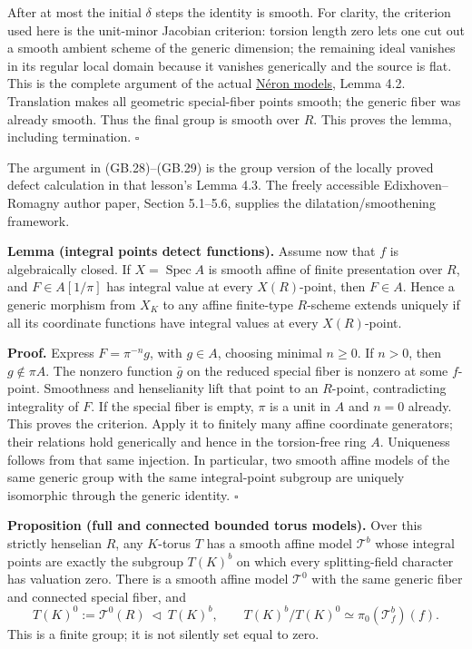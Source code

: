 \documentclass[
  11pt,
]{article}
\begin{document}
After at most the initial \(\delta\) steps the identity is smooth. For
clarity, the criterion used here is the unit-minor Jacobian criterion:
torsion length zero lets one cut out a smooth ambient scheme of the
generic dimension; the remaining ideal vanishes in its regular local
domain because it vanishes generically and the source is flat. This is
the complete argument of the actual \href{../AG-GS/AG-GS-07.html}{Néron
models}, Lemma 4.2. Translation makes all geometric special-fiber points
smooth; the generic fiber was already smooth. Thus the final group is
smooth over \(R\). This proves the lemma, including termination.
\(\square\)

The argument in (GB.28)--(GB.29) is the group version of the locally
proved defect calculation in that lesson's Lemma 4.3. The freely
accessible Edixhoven--Romagny author paper, Section 5.1--5.6, supplies
the dilatation/smoothening framework.

\textbf{Lemma (integral points detect functions).} Assume now that \(f\)
is algebraically closed. If \(X=\operatorname {Spec}A\) is smooth affine
of finite presentation over \(R\), and \(F\in A[1/\pi]\) has integral
value at every \(X(R)\)-point, then \(F\in A\). Hence a generic morphism
from \(X_K\) to any affine finite-type \(R\)-scheme extends uniquely if
all its coordinate functions have integral values at every
\(X(R)\)-point.

\textbf{Proof.} Express \(F=\pi^{-n}g\), with \(g\in A\), choosing
minimal \(n\geq0\). If \(n>0\), then \(g\notin\pi A\). The nonzero
function \(\bar g\) on the reduced special fiber is nonzero at some
\(f\)-point. Smoothness and henselianity lift that point to an
\(R\)-point, contradicting integrality of \(F\). If the special fiber is
empty, \(\pi\) is a unit in \(A\) and \(n=0\) already. This proves the
criterion. Apply it to finitely many affine coordinate generators; their
relations hold generically and hence in the torsion-free ring \(A\).
Uniqueness follows from that same injection. In particular, two smooth
affine models of the same generic group with the same integral-point
subgroup are uniquely isomorphic through the generic identity.
\(\square\)

\textbf{Proposition (full and connected bounded torus models).} Over
this strictly henselian \(R\), any \(K\)-torus \(T\) has a smooth affine
model \(\mathcal T^b\) whose integral points are exactly the subgroup
\(T(K)^b\) on which every splitting-field character has valuation zero.
There is a smooth affine model \(\mathcal T^0\) with the same generic
fiber and connected special fiber, and \[
 T(K)^0:=\mathcal T^0(R)\ \triangleleft\ T(K)^b,\qquad
 T(K)^b/T(K)^0\simeq\pi_0(\mathcal T^b_f)(f).
 \tag{GB.30}
\] This is a finite group; it is not silently set equal to zero.
\end{document}
